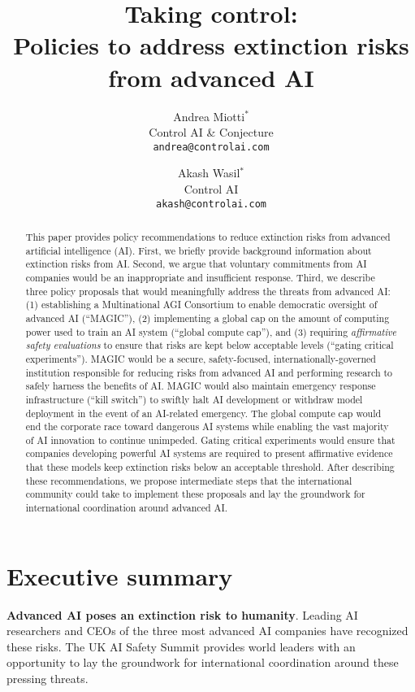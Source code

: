 \documentclass[12pt,a4paper]{article}
\title{Taking control: \\
Policies to address extinction risks from advanced AI}
\author{
Andrea Miotti$^*$\\
\small{Control AI \& Conjecture}\\
\small\texttt{andrea@controlai.com}
\and 
Akash Wasil$^*$\\
\small{Control AI}\\
\small\texttt{akash@controlai.com}
}\date{}
\begin{document}
\maketitle

\begin{abstract}

\noindent
This paper provides policy recommendations to reduce extinction risks from advanced artificial intelligence (AI). First, we briefly provide background information about extinction risks from AI. Second, we argue that voluntary commitments from AI companies would be an inappropriate and insufficient response. Third, we describe three policy proposals that would meaningfully address the threats from advanced AI: (1) establishing a Multinational AGI Consortium to enable democratic oversight of advanced AI (“MAGIC”), (2) implementing a global cap on the amount of computing power used to train an AI system (“global compute cap”), and (3) requiring \textit{affirmative safety evaluations} to ensure that risks are kept below acceptable levels (“gating critical experiments”). MAGIC would be a secure, safety-focused, internationally-governed institution responsible for reducing risks from advanced AI and performing research to safely harness the benefits of AI. MAGIC would also maintain emergency response infrastructure (“kill switch”) to swiftly halt AI development or withdraw model deployment in the event of an AI-related emergency. The global compute cap would end the corporate race toward dangerous AI systems while enabling the vast majority of AI innovation to continue unimpeded. Gating critical experiments would ensure that companies developing powerful AI systems are required to present affirmative evidence that these models keep extinction risks below an acceptable threshold. After describing these recommendations, we propose intermediate steps that the international community could take to implement these proposals and lay the groundwork for international coordination around advanced AI.

\end{abstract}
\newpage
\section{Executive summary}

\textbf{Advanced AI poses an extinction risk to humanity}. Leading AI researchers and CEOs of the three most advanced AI companies have recognized these risks. The UK AI Safety Summit provides world leaders with an opportunity to lay the groundwork for international coordination around these pressing threats. 
\end{document}
